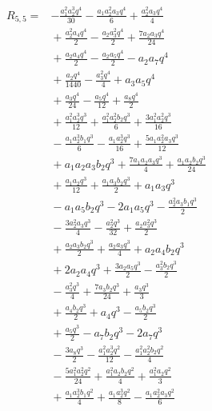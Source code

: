 \begin{align*}
R_{5,5}={}&- \frac{a_{1}^{2} a_{2}^{3} q^{4}}{30} - \frac{a_{1} a_{2}^{2} a_{3} q^{4}}{6} + \frac{a_{2}^{2} a_{3} q^{4}}{4}\\
&{}+ \frac{a_{2}^{2} a_{4} q^{4}}{2} - \frac{a_{2} a_{3}^{2} q^{4}}{2} + \frac{7 a_{2} a_{3} q^{4}}{24}\\
&{}+ \frac{a_{2} a_{4} q^{4}}{2} - \frac{a_{2} a_{5} q^{4}}{2} - a_{2} a_{7} q^{4}\\
&{}+ \frac{a_{2} q^{4}}{1440} - \frac{a_{3}^{2} q^{4}}{4} + a_{3} a_{5} q^{4}\\
&{}+ \frac{a_{3} q^{4}}{24} - \frac{a_{5} q^{4}}{12} + \frac{a_{8} q^{4}}{2}\\
&{}+ \frac{a_{1}^{2} a_{2}^{3} q^{3}}{12} + \frac{a_{1}^{2} a_{2}^{2} b_{2} q^{3}}{6} + \frac{3 a_{1}^{2} a_{2}^{2} q^{3}}{16}\\
&{}- \frac{a_{1} a_{2}^{3} b_{1} q^{3}}{6} - \frac{a_{1} a_{2}^{3} q^{3}}{16} + \frac{5 a_{1} a_{2}^{2} a_{3} q^{3}}{12}\\
&{}+ a_{1} a_{2} a_{3} b_{2} q^{3} + \frac{7 a_{1} a_{2} a_{3} q^{3}}{4} + \frac{a_{1} a_{2} b_{2} q^{3}}{24}\\
&{}+ \frac{a_{1} a_{2} q^{3}}{12} + \frac{a_{1} a_{3} b_{2} q^{3}}{2} + a_{1} a_{3} q^{3}\\
&{}- a_{1} a_{5} b_{2} q^{3} - 2 a_{1} a_{5} q^{3} - \frac{a_{2}^{2} a_{3} b_{1} q^{3}}{2}\\
&{}- \frac{3 a_{2}^{2} a_{3} q^{3}}{4} - \frac{a_{2}^{2} q^{3}}{32} + \frac{a_{2} a_{3}^{2} q^{3}}{2}\\
&{}+ \frac{a_{2} a_{3} b_{2} q^{3}}{2} + \frac{a_{2} a_{3} q^{3}}{4} + a_{2} a_{4} b_{2} q^{3}\\
&{}+ 2 a_{2} a_{4} q^{3} + \frac{3 a_{2} a_{5} q^{3}}{2} - \frac{a_{3}^{2} b_{2} q^{3}}{2}\\
&{}- \frac{a_{3}^{2} q^{3}}{4} + \frac{7 a_{3} b_{2} q^{3}}{24} + \frac{a_{3} q^{3}}{3}\\
&{}+ \frac{a_{4} b_{2} q^{3}}{2} + a_{4} q^{3} - \frac{a_{5} b_{2} q^{3}}{2}\\
&{}+ \frac{a_{5} q^{3}}{2} - a_{7} b_{2} q^{3} - 2 a_{7} q^{3}\\
&{}- \frac{3 a_{8} q^{3}}{2} - \frac{a_{1}^{2} a_{2}^{3} q^{2}}{12} - \frac{a_{1}^{2} a_{2}^{2} b_{2} q^{2}}{4}\\
&{}- \frac{5 a_{1}^{2} a_{2}^{2} q^{2}}{24} + \frac{a_{1}^{2} a_{2} b_{2} q^{2}}{4} + \frac{a_{1}^{2} a_{2} q^{2}}{3}\\
&{}+ \frac{a_{1} a_{2}^{3} b_{1} q^{2}}{4} + \frac{a_{1} a_{2}^{3} q^{2}}{8} - \frac{a_{1} a_{2}^{2} a_{3} q^{2}}{6}\\

\end{align*}
